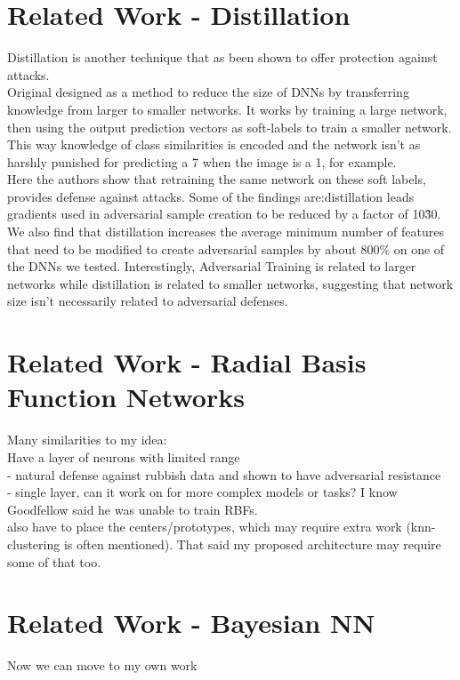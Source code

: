 \documentclass{article}
\begin{document}
\section{Related Work - Distillation}
Distillation is another technique that as been shown to offer protection against attacks.\\
Original designed as a method to reduce the size of DNNs by transferring knowledge from larger to smaller networks. It works by training a large network, then using the output prediction vectors as soft-labels to train a smaller network. This way knowledge of class similarities is encoded and the network isn't as harshly punished for predicting a 7 when the image is a  1, for example.\\
Here the authors show that retraining the same network on these soft labels, provides defense against attacks. Some of the findings are:distillation leads gradients used in adversarial sample creation to be reduced by a factor of
10\^30. We also find that distillation increases the average minimum
number of features that need to be modified to create adversarial
samples by about 800\% on one of the DNNs we tested.
Interestingly, Adversarial Training is related to larger networks while distillation is related to smaller networks, suggesting that network size isn't necessarily related to adversarial defenses.

\section{Related Work - Radial Basis Function Networks}
Many similarities to my idea:\\
Have a layer of neurons with limited range\\
 - natural defense against rubbish data and shown to have adversarial resistance\\
 - single layer, can it work on for more complex models or tasks? I know Goodfellow said he was unable to train RBFs.\\
 also have to place the centers/prototypes, which may require extra work (knn-clustering is often mentioned). That said my proposed architecture may require some of that too. 

\section{Related Work - Bayesian NN}


Now we can move to my own work
\end{document}
